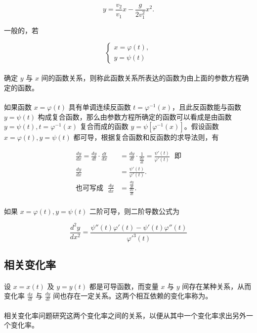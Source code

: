 \begin{equation}
y = \frac{v_2}{v_1}x - \frac{g}{2v_1^2}x^2.
\end{equation}

一般的，若

\begin{equation}
\left\{
\begin{array}{l}
  x = \varphi(t), \\
  y = \psi(t)
\end{array}
\right.
\end{equation}

\paragraph{}
确定 $y$ 与 $x$ 间的函数关系，则称此函数关系所表达的函数为由上面的参数方程确定的函数。

\paragraph{}
如果函数 $x = \varphi(t)$ 具有单调连续反函数 $t = \varphi^{-1}(x)$，且此反函数能与函数 $y = \psi(t)$ 构成复合函数，那么由参数方程所确定的函数可以看成是由函数 $y = \psi(t), t = \varphi^{-1}(x)$ 复合而成的函数 $y = \psi[\varphi^{-1}(x)]$。假设函数 $x = \varphi(t), y = \psi(t)$ 都可导，根据复合函数和反函数的求导法则，有

\begin{align}
\frac{dy}{dx} = \frac{dy}{dt} \cdot \frac{dt}{dx} &= \frac{dy}{dt} \cdot \frac{1}{\frac{dx}{dt}} = \frac{\psi'(t)}{\varphi'(t)} \text{~~即} \\
\frac{dy}{dx} &= \frac{\psi'(t)}{\varphi'(t)}. \\
\text{也可写成~~} \frac{dy}{dx} &= \frac{\frac{dy}{dt}}{\frac{dx}{dt}}.
\end{align}

\paragraph{}
如果 $x = \varphi(t), y = \psi(t)$ 二阶可导，则二阶导数公式为

\begin{equation}
\frac{d^2y}{dx^2} = \frac{\psi''(t)\varphi'(t) - \psi'(t)\varphi''(t)}{\varphi'^3(t)}
\end{equation}

\subsection{相关变化率}
\paragraph{}
设 $x = x(t)$ 及 $y = y(t)$ 都是可导函数，而变量 $x$ 与 $y$ 间存在某种关系，从而变化率 $\frac{dx}{dt}$ 与 $\frac{dy}{dt}$ 间也存在一定关系。这两个相互依赖的变化率称为。

\paragraph{}
相关变化率问题研究这两个变化率之间的关系，以便从其中一个变化率求出另外一个变化率。
